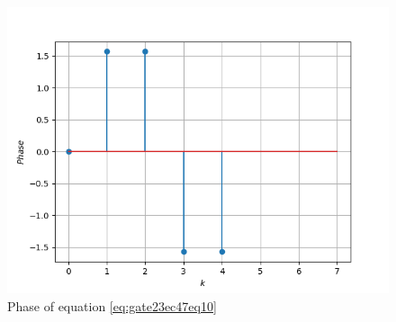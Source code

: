 \documentclass[journal,12pt,onecolumn]{IEEEtran}
\theoremstyle{remark}
\begin{document}
\begin{enumerate}
\begin{figure}[h!]
    \includegraphics[width=\columnwidth]{figs/mm21.png}
    \caption{Phase of equation \eqref{eq:gate23ec47eq10}}
    \label{fig:gate23ec47fig4}
\end{figure}

\end{enumerate}
\end{document}
